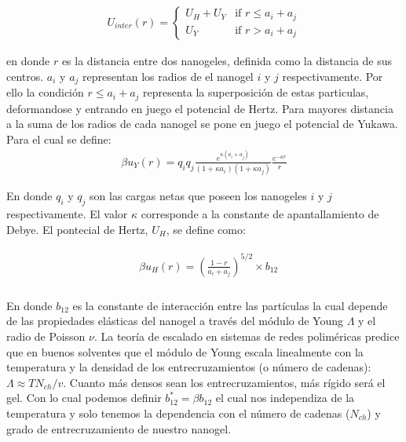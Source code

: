 \begin{align}
	U_{inter}(r) = \begin{cases} U_H + U_Y & \text{if } r \leq a_i + a_j \\ U_Y & \text{if } r > a_i + a_j \end{cases} 
	\label{eq:HY-potential}
\end{align}

en donde $r$ es la distancia entre dos nanogeles, definida como la distancia de sus centros. 
$a_i$ y $a_j$ representan los radios de el nanogel $i$ y $j$ respectivamente. Por ello la condici\'on $r \leq a_i +a_j$ representa la superposici\'on de estas particulas, deformandose y entrando en juego el potencial de Hertz.
Para mayores distancia a la suma de los radios de cada nanogel se pone en juego el potencial de Yukawa. Para el cual se define:
\begin{align}
	\beta u_Y(r) = q_i q_j \frac{e^{\kappa(a_i + a_j)}}{(1 +\kappa a_i)(1 + \kappa a_j)} \frac{e^{-\kappa r}}{r} 
	\label{eq:yukawa}
\end{align}

En donde $q_i$ y $q_j$ son las cargas netas que poseen los nanogeles $i$ y $j$ respectivamente. El valor $\kappa$ corresponde a la constante de apantallamiento de Debye. 
El pontecial de Hertz, $U_H$, se define como:
 

\begin{align}
	\begin{aligned}
		& \beta u_H (r) = \left(\frac{1-r}{a_i + a_j}\right)^{5/2}\times b_{12} \\
	\end{aligned}
\end{align}


En donde $b_{12}$ es la constante de interacci\'on entre las part\'iculas la cual depende de las propiedades el\'asticas del nanogel a trav\'es del m\'odulo de Young $\Lambda$ y el radio de Poisson $\nu$. \addcite[landau] La teor\'ia de escalado en sistemas de redes polim\'ericas predice que en buenos solventes \addcite que el m\'odulo de Young  escala linealmente con la temperatura y la densidad de los entrecruzamientos (o n\'umero de cadenas): $\Lambda \approx TN_{ch}/v$. Cuanto m\'as densos sean los entrecruzamientos, m\'as r\'igido ser\'a el gel.
Con lo cual podemos definir $b_{12}^\ast = \beta b_{12}$ el cual nos independiza de la temperatura y solo tenemos la dependencia con el n\'umero de cadenas ($N_{ch}$) y grado de entrecruzamiento de nuestro nanogel. 




